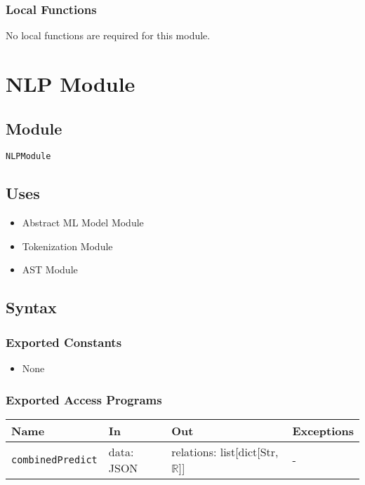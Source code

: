 \documentclass[12pt, titlepage]{article}
\begin{document}
\subsubsection{Local Functions}
No local functions are required for this module.


\section{NLP Module}  \label{NLPModule} %

\subsection{Module}

\texttt{NLPModule}

\subsection{Uses}

\begin{itemize}
    \item Abstract ML Model Module
    \item Tokenization Module
    \item AST Module
\end{itemize}

\subsection{Syntax}

\subsubsection{Exported Constants}

\begin{itemize}
    \item None
\end{itemize}

\subsubsection{Exported Access Programs}

\begin{center}
\begin{tabular}{p{5cm} p{3.5cm} p{3.5cm} p{2cm}}
\hline
\textbf{Name} & \textbf{In} & \textbf{Out} & \textbf{Exceptions} \\ 
\hline
\texttt{combinedPredict} & data: JSON & relations: list[dict[Str, $\mathbb{R}$]] & -\\
\hline
\end{tabular}
\end{center}
\end{document}
